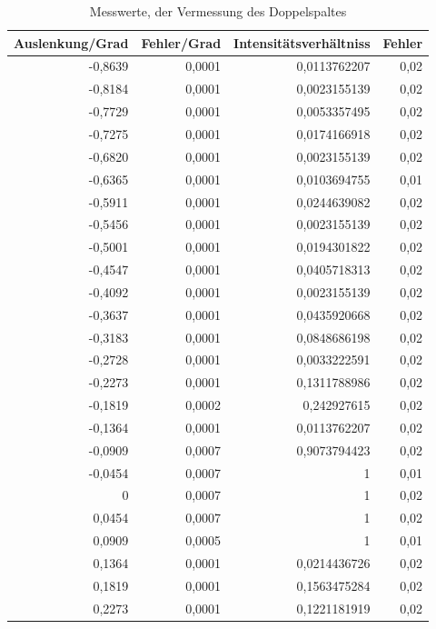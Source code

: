\documentclass[12pt]{scrartcl}
\begin{document}
\begin{table}[H]
\caption{Messwerte, der Vermessung des Doppelspaltes}
\begin{center}
\begin{tabular}{|r|r|r|r|}
\hline
\multicolumn{1}{|l|}{Auslenkung/Grad} & \multicolumn{1}{l|}{Fehler/Grad} & \multicolumn{1}{l|}{Intensitätsverhältniss} & \multicolumn{1}{l|}{Fehler} \\ \hline
-0,8639 & 0,0001 & 0,0113762207 & 0,02 \\ \hline
-0,8184 & 0,0001 & 0,0023155139 & 0,02 \\ \hline
-0,7729 & 0,0001 & 0,0053357495 & 0,02 \\ \hline
-0,7275 & 0,0001 & 0,0174166918 & 0,02 \\ \hline
-0,6820 & 0,0001 & 0,0023155139 & 0,02 \\ \hline
-0,6365 & 0,0001 & 0,0103694755 & 0,01 \\ \hline
-0,5911 & 0,0001 & 0,0244639082 & 0,02 \\ \hline
-0,5456 & 0,0001 & 0,0023155139 & 0,02 \\ \hline
-0,5001 & 0,0001 & 0,0194301822 & 0,02 \\ \hline
-0,4547 & 0,0001 & 0,0405718313 & 0,02 \\ \hline
-0,4092 & 0,0001 & 0,0023155139 & 0,02 \\ \hline
-0,3637 & 0,0001 & 0,0435920668 & 0,02 \\ \hline
-0,3183 & 0,0001 & 0,0848686198 & 0,02 \\ \hline
-0,2728 & 0,0001 & 0,0033222591 & 0,02 \\ \hline
-0,2273 & 0,0001 & 0,1311788986 & 0,02 \\ \hline
-0,1819 & 0,0002 & 0,242927615 & 0,02 \\ \hline
-0,1364 & 0,0001 & 0,0113762207 & 0,02 \\ \hline
-0,0909 & 0,0007 & 0,9073794423 & 0,02 \\ \hline
-0,0454 & 0,0007 & 1 & 0,01 \\ \hline
0 & 0,0007 & 1 & 0,02 \\ \hline
0,0454 & 0,0007 & 1 & 0,02 \\ \hline
0,0909 & 0,0005 & 1 & 0,01 \\ \hline
0,1364 & 0,0001 & 0,0214436726 & 0,02 \\ \hline
0,1819 & 0,0001 & 0,1563475284 & 0,02 \\ \hline
0,2273 & 0,0001 & 0,1221181919 & 0,02 \\ \hline

\end{tabular}
\end{center}
\end{table}
\end{document}

